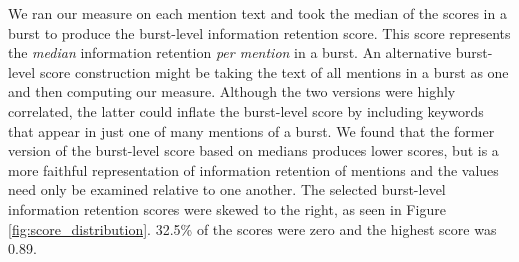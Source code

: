 \documentclass[letterpaper]{article} %
\begin{document}
We ran our measure on each mention text and took the median of the scores in a burst to produce the burst-level information retention score. This score represents the \textit{median} information retention \textit{per mention} in a burst. An alternative burst-level score construction might be taking the text of all mentions in a burst as one and then computing our measure. Although the two versions were highly correlated, the latter could inflate the burst-level score by including keywords that appear in just one of many mentions of a burst. We found that the former version of the burst-level score based on medians produces lower scores, but is a more faithful representation of information retention of mentions and the values need only be examined relative to one another.
The selected burst-level information retention scores were skewed to the right, as seen in Figure \ref{fig:score_distribution}. 32.5\% of the scores were zero and the highest score was 0.89.


\end{document}
